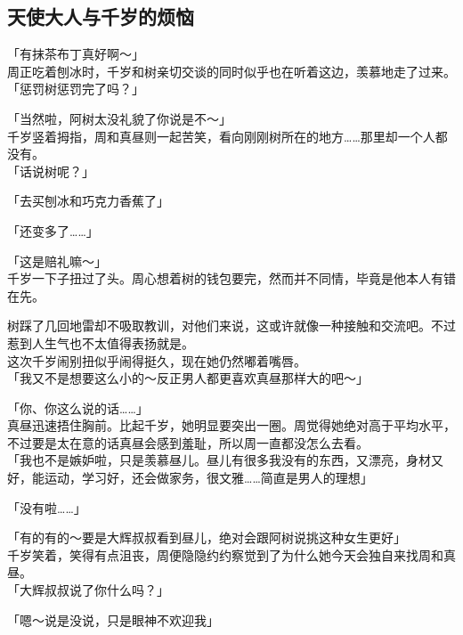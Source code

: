 \subsection{天使大人与千岁的烦恼}

「有抹茶布丁真好啊～」\\

周正吃着刨冰时，千岁和树亲切交谈的同时似乎也在听着这边，羡慕地走了过来。\\

「惩罚树惩罚完了吗？」

「当然啦，阿树太没礼貌了你说是不～」\\

千岁竖着拇指，周和真昼则一起苦笑，看向刚刚树所在的地方……那里却一个人都没有。\\

「话说树呢？」

「去买刨冰和巧克力香蕉了」

「还变多了……」

「这是赔礼嘛～」\\

千岁一下子扭过了头。周心想着树的钱包要完，然而并不同情，毕竟是他本人有错在先。

树踩了几回地雷却不吸取教训，对他们来说，这或许就像一种接触和交流吧。不过惹到人生气也不太值得表扬就是。\\

这次千岁闹别扭似乎闹得挺久，现在她仍然嘟着嘴唇。\\

「我又不是想要这么小的～反正男人都更喜欢真昼那样大的吧～」

「你、你这么说的话……」\\

真昼迅速捂住胸前。比起千岁，她明显要突出一圈。周觉得她绝对高于平均水平，不过要是太在意的话真昼会感到羞耻，所以周一直都没怎么去看。\\

「我也不是嫉妒啦，只是羡慕昼儿。昼儿有很多我没有的东西，又漂亮，身材又好，能运动，学习好，还会做家务，很文雅……简直是男人的理想」

「没有啦……」

「有的有的～要是大辉叔叔看到昼儿，绝对会跟阿树说挑这种女生更好」\\

千岁笑着，笑得有点沮丧，周便隐隐约约察觉到了为什么她今天会独自来找周和真昼。\\

「大辉叔叔说了你什么吗？」

「嗯～说是没说，只是眼神不欢迎我」\\

